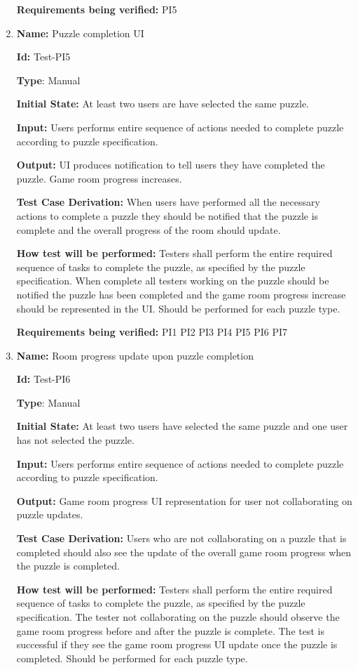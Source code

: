 \documentclass[12pt, titlepage]{article}
\begin{document}
\begin{enumerate}
\textbf{Requirements being verified: } PI5

\item{\textbf{Name:} Puzzle completion UI}

\textbf{Id:} Test-PI5

\textbf{Type}: Manual

\textbf{Initial State:} At least two users are have selected the same puzzle.

\textbf{Input:} Users performs entire sequence of actions needed to complete puzzle according to puzzle specification.

\textbf{Output:} UI produces notification to tell users they have completed the puzzle. Game room progress increases.

\textbf{Test Case Derivation:}
When users have performed all the necessary actions to complete a puzzle they should be notified that the puzzle is complete and the overall progress of the room should update.

\textbf{How test will be performed:}
Testers shall perform the entire required sequence of tasks to complete the puzzle, as specified by the puzzle specification. When complete all testers working on the puzzle should be notified the puzzle has been completed and the game room progress increase should be represented in the UI. Should be performed for each puzzle type.

\textbf{Requirements being verified: } PI1 PI2 PI3 PI4 PI5 PI6 PI7

\item{\textbf{Name:} Room progress update upon puzzle completion}

\textbf{Id:} Test-PI6

\textbf{Type}: Manual

\textbf{Initial State:} At least two users have selected the same puzzle and one user has not selected the puzzle.

\textbf{Input:} Users performs entire sequence of actions needed to complete puzzle according to puzzle specification.

\textbf{Output:} Game room progress UI representation for user not collaborating on puzzle updates.

\textbf{Test Case Derivation:}
Users who are not collaborating on a puzzle that is completed should also see the update of the overall game room progress when the puzzle is completed.

\textbf{How test will be performed:}
Testers shall perform the entire required sequence of tasks to complete the puzzle, as specified by the puzzle specification. The tester not collaborating on the puzzle should observe the game room progress before and after the puzzle is complete. The test is successful if they see the game room progress UI update once the puzzle is completed. Should be performed for each puzzle type.


\end{enumerate}
\end{document}
